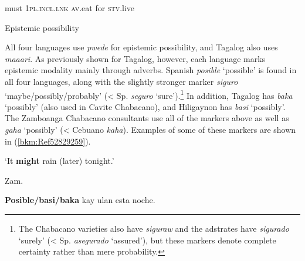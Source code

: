 \begin{stylelsIMT}
must 1\textsc{pl.incl.lnk} \textsc{av}.eat for \textsc{stv}.live
\end{stylelsIMT}


\setcounter{listWWNumiiileveli}{0}
\begin{listWWNumiiileveli}
\item 

\setcounter{listWWNumiiilevelii}{0}
\begin{listWWNumiiilevelii}
\item 
\begin{stylelsSectionii}
Epistemic possibility
\end{stylelsSectionii}
\end{listWWNumiiilevelii}
\end{listWWNumiiileveli}
\begin{styleStandard}
All four languages use \textit{pwede} for epistemic possibility, and Tagalog also uses \textit{maaari}. As previously shown for Tagalog, however, each language marks epistemic modality mainly through adverbs. Spanish \textit{posible} ‘possible’ is found in all four languages, along with the slightly stronger marker \textit{siguro} ‘maybe/possibly/probably’ ({\textless} Sp. \textit{seguro }‘sure’).\footnote{ The Chabacano varieties also have \textit{siguraw }and the adstrates have \textit{sigurado} ‘surely’ ({\textless} Sp. \textit{asegurado} ‘assured’), but these markers denote complete certainty rather than mere probability.} In addition, Tagalog has \textit{baka} ‘possibly’ (also used in Cavite Chabacano), and Hiligaynon has \textit{basi }‘possibly’. The Zamboanga Chabacano consultants use all of the markers above as well as \textit{gaha} ‘possibly’ ({\textless} Cebuano \textit{kaha}). Examples of some of these markers are shown in (\ref{bkm:Ref52829259}).
\end{styleStandard}


\setcounter{listWWNumiileveli}{0}
\begin{listWWNumiileveli}
\item 
\begin{stylelsLanginfo}
\label{bkm:Ref52829259}‘It \textbf{might} rain (later) tonight.’
\end{stylelsLanginfo}


\setcounter{listWWNumiilevelii}{0}
\begin{listWWNumiilevelii}
\item 
\begin{stylelsLanginfo}
Zam.
\end{stylelsLanginfo}
\end{listWWNumiilevelii}
\end{listWWNumiileveli}
\begin{stylelsSourceline}
\textbf{Posible/basi/baka} kay ulan esta noche\textup{.}
\end{stylelsSourceline}

